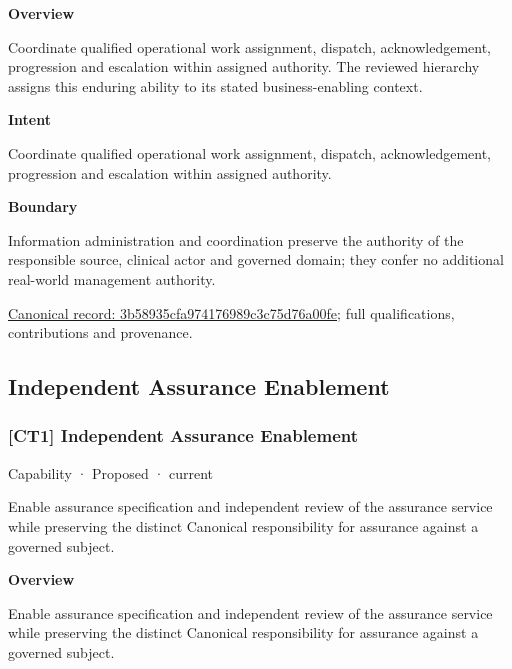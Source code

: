 \textbf{Overview}



Coordinate qualified operational work assignment, dispatch, acknowledgement, progression and escalation within assigned authority. The reviewed hierarchy assigns this enduring ability to its stated business-enabling context.



\textbf{Intent}



Coordinate qualified operational work assignment, dispatch, acknowledgement, progression and escalation within assigned authority.



\textbf{Boundary}



Information administration and coordination preserve the authority of the responsible source, clinical actor and governed domain; they confer no additional real-world management authority.


{\footnotesize \href{../../../../continuum/strategy/capability/3b58935cfa974176989c3c75d76a00fe.md}{Canonical record: 3b58935cfa974176989c3c75d76a00fe}; full qualifications, contributions and provenance.}\par
\subsection{Independent Assurance Enablement}

\subsubsection{[CT1] Independent Assurance Enablement}

\label{element:616682b612d244429e656b040e002d56}
{\small Capability · Proposed · current}\par

Enable assurance specification and independent review of the assurance service while preserving the distinct Canonical responsibility for assurance against a governed subject.



\textbf{Overview}



Enable assurance specification and independent review of the assurance service while preserving the distinct Canonical responsibility for assurance against a governed subject.



